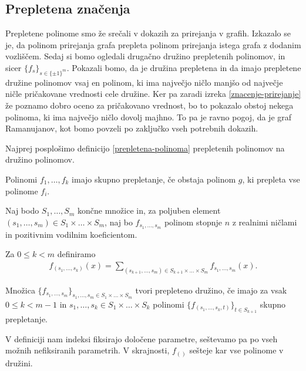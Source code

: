 \subsection{Prepletena značenja}
Prepletene polinome smo že srečali v dokazih za prirejanja v grafih. Izkazalo se je, da polinom prirejanja grafa prepleta polinom prirejanja istega grafa z dodanim vozliščem. Sedaj si bomo ogledali drugačno družino prepletenih polinomov, in sicer \(\{f_s\}_{s\in \{\pm 1\}^m}\). Pokazali bomo, da je družina prepletena in da imajo prepletene družine polinomov vsaj en polinom, ki ima največjo ničlo manjšo od največje ničle pričakovane vrednosti cele družine. Ker pa zaradi izreka \ref{znacenje-prirejanje} že poznamo dobro oceno za pričakovano vrednost, bo to pokazalo obstoj nekega polinoma, ki ima največjo ničlo dovolj majhno. To pa je ravno pogoj, da je graf Ramanujanov, kot bomo povzeli po zaključko vseh potrebnih dokazih.

Najprej posplošimo definicijo \ref{prepletena-polinoma} prepletenih polinomov na družino polinomov.
\begin{definicija}
    Polinomi \(f_1, \ldots, f_k\) imajo skupno prepletanje, če obstaja polinom \(g\), ki prepleta vse polinome \(f_i\).
\end{definicija}
\begin{definicija}\label{prepletena-druzina}
    Naj bodo \(S_1, \ldots, S_m\) končne množice in, za poljuben element \((s_1, \ldots, s_m)\in S_1\times \ldots \times S_m\), naj bo \(f_{s_1, \ldots, s_m}\) polinom stopnje \(n\) z realnimi ničlami in pozitivnim vodilnim koeficientom.

    Za \(0\leq k<m\) definiramo
    \begin{align*}
        f_{(s_1, \ldots, s_k)}(x) = \sum_{(s_{k+1}, \ldots, s_m)\in S_{k+1}\times \ldots \times S_m} f_{s_1, \ldots, s_m}(x).
    \end{align*}

    Množica \(\{f_{s_1,\ldots, s_m}\}_{s_1,\ldots, s_m\in S_1\times \ldots \times S_m}\) tvori prepleteno družino, če imajo za vsak \(0\leq k<m-1\) in \(s_1, \ldots, s_k\in S_1\times \ldots \times S_k\) polinomi \(\{f_{(s_1, \ldots, s_k, t)}\}_{t\in S_{k+1}}\)  skupno prepletanje.
\end{definicija}
V definiciji nam indeksi fiksirajo določene parametre, seštevamo pa po vseh možnih nefiksiranih parametrih. V skrajnosti, \(f_{()}\) sešteje kar vse polinome v družini.

